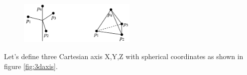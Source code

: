 
\begin{figure}[H]
    \centering
    \includegraphics[width=0.5\textwidth]{Figures/arrayex.png}
    \label{fig:arrayex}
\end{figure}

Let's define three Cartesian axis X,Y,Z with spherical coordinates as shown in figure \ref{fig:3daxis}.

